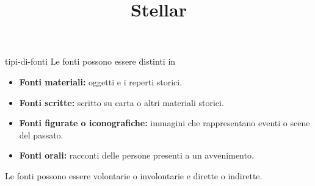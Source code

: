 \documentclass[preview]{standalone}
\begin{document}
\title{Stellar}
\genpage

\begin{snippet}{tipi-di-fonti}
    Le fonti possono essere distinti in
    \begin{itemize}
        \item \textbf{Fonti materiali:} oggetti e i reperti storici.
        \item \textbf{Fonti scritte:} scritto su carta o altri materiali storici.
        \item \textbf{Fonti figurate o iconografiche:} immagini che rappresentano eventi o scene del passato.
        \item \textbf{Fonti orali:} racconti delle persone presenti a un avvenimento.
    \end{itemize}

    Le fonti possono essere volontarie o involontarie e
    dirette o indirette.
\end{snippet}
\end{document}
